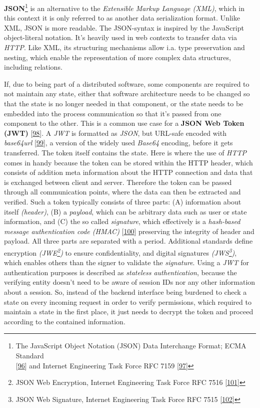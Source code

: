 \documentclass[12pt,english,a4paper,titlepage,cleardoublepage=empty,dottedtoc]{report}
\begin{document}
\textbf{JSON}\footnote{The JavaScript Object Notation (JSON) Data
  Interchange Format; ECMA Standard\\
  {[}\protect\hyperlink{ref-web_spec_json}{96}{]} and Internet
  Engineering Task Force RFC 7159
  {[}\protect\hyperlink{ref-web_rfc_json}{97}{]}} is an alternative to
the \emph{Extensible Markup Language (XML)}, which in this context it is
only referred to as another data serialization format. Unlike XML, JSON
is more readable. The JSON-syntax is inspired by the JavaScript
object-literal notation. It's heavily used in web contexts to transfer
data via \emph{HTTP}. Like XML, its structuring mechanisms allow i.a.
type preservation and nesting, which enable the representation of more
complex data structures, including relations.

If, due to being part of a distributed software, some components are
required to not maintain any state, either that software architecture
needs to be changed so that the state is no longer needed in that
component, or the state needs to be embedded into the process
communication so that it's passed from one component to the other. This
is a common use case for a \textbf{\protect\hypertarget{def--jwt}{}{JSON
Web Token (JWT)}}
{[}\protect\hyperlink{ref-web_spec_json-web-token}{98}{]}. A \emph{JWT}
is formatted as \emph{JSON}, but URL-safe encoded with \emph{base64url}
{[}\protect\hyperlink{ref-web_spec_base64url}{99}{]}, a version of the
widely used \emph{Base64} encoding, before it gets transferred. The
token itself contains the state. Here is where the use of \emph{HTTP}
comes in handy because the token can be stored within the HTTP header,
which consists of addition meta information about the HTTP connection
and data that is exchanged between client and server. Therefore the
token can be passed through all communication points, where the data can
then be extracted and verified. Such a token typically consists of three
parts: (A) information about itself \emph{(header)}, (B) a
\emph{payload}, which can be arbitrary data such as user or state
information, and (C) the so called \emph{signature}, which effectively
is a \emph{hash-based message authentication code (HMAC)}
{[}\protect\hyperlink{ref-web_spec_hmac}{100}{]} preserving the
integrity of header and payload. All three parts are separated with a
period. Additional standards define encryption \emph{(JWE\footnote{JSON
  Web Encryption, Internet Engineering Task Force RFC 7516
  {[}\protect\hyperlink{ref-web_spec_json-web-encryption}{101}{]}})} to
ensure confidentiality, and digital signatures \emph{(JWS\footnote{JSON
  Web Signature, Internet Engineering Task Force RFC 7515
  {[}\protect\hyperlink{ref-web_spec_json-web-signature}{102}{]}})},
which enables others than the signer to validate the \emph{signature}.
Using a \emph{JWT} for authentication purposes is described as
\emph{stateless authentication}, because the verifying entity doesn't
need to be aware of session IDs nor any other information about a
session. So, instead of the backend interface being burdened to check a
state on every incoming request in order to verify permissions, which
required to maintain a state in the first place, it just needs to
decrypt the token and proceed according to the contained information.
\end{document}
